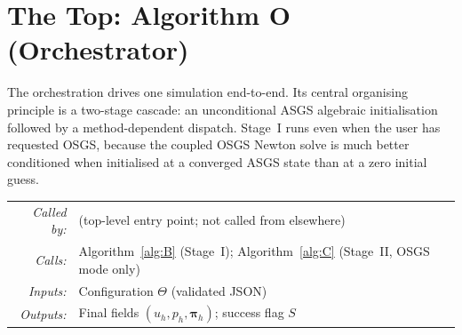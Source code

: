 \documentclass{article}
\makeatletter
\newcommand{\moduleinterface}[4]{%
\begin{interfacecard}
\footnotesize
\begin{tabular}{@{}r@{\quad}p{0.82\textwidth}@{}}
\textit{Called by:} & #1 \\
\textit{Calls:}     & #2 \\
\textit{Inputs:}    & #3 \\
\textit{Outputs:}   & #4 \\
\end{tabular}
\end{interfacecard}
}
\makeatother
\begin{document}
\section{The Top: Algorithm O (Orchestrator)}
\label{sec:orchestration}

The orchestration drives one simulation end-to-end. Its central
organising principle is a two-stage cascade: an unconditional ASGS
algebraic initialisation followed by a method-dependent dispatch.
Stage~I runs even when the user has requested OSGS, because the
coupled OSGS Newton solve is much better conditioned when initialised
at a converged ASGS state than at a zero initial guess.

\moduleinterface
    {(top-level entry point; not called from elsewhere)}
    {Algorithm~\ref{alg:B} (Stage~I); Algorithm~\ref{alg:C} (Stage~II, OSGS mode only)}
    {Configuration $\Theta$ (validated JSON)}
    {Final fields $(u_h, p_h, \boldsymbol{\pi}_h)$; success flag $S$}
\end{document}
